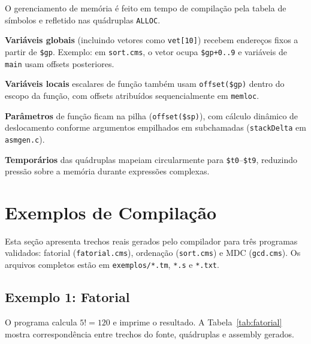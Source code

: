 \documentclass[
	12pt,				%
	openright,			%
	a4paper,			%
	english,			%
	french,				%
	spanish,			%
	brazil,				%
	]{abntex2}
\begin{document}
O gerenciamento de memória é feito em tempo de compilação pela tabela de símbolos e refletido nas quádruplas \texttt{ALLOC}.

\textbf{Variáveis globais} (incluindo vetores como \texttt{vet[10]}) recebem endereços fixos a partir de \texttt{\$gp}. Exemplo: em \texttt{sort.cms}, o vetor ocupa \texttt{\$gp+0..9} e variáveis de \texttt{main} usam offsets posteriores.

\textbf{Variáveis locais} escalares de função também usam \texttt{offset(\$gp)} dentro do escopo da função, com offsets atribuídos sequencialmente em \texttt{memloc}.

\textbf{Parâmetros} de função ficam na pilha (\texttt{offset(\$sp)}), com cálculo dinâmico de deslocamento conforme argumentos empilhados em subchamadas (\texttt{stackDelta} em \texttt{asmgen.c}).

\textbf{Temporários} das quádruplas mapeiam circularmente para \texttt{\$t0}--\texttt{\$t9}, reduzindo pressão sobre a memória durante expressões complexas.

\chapter{Exemplos de Compilação}

Esta seção apresenta trechos reais gerados pelo compilador para três programas validados: fatorial (\texttt{fatorial.cms}), ordenação (\texttt{sort.cms}) e MDC (\texttt{gcd.cms}). Os arquivos completos estão em \texttt{exemplos/*.tm}, \texttt{*.s} e \texttt{*.txt}.

\section{Exemplo 1: Fatorial}

O programa calcula $5! = 120$ e imprime o resultado. A Tabela~\ref{tab:fatorial} mostra correspondência entre trechos do fonte, quádruplas e assembly gerados.
\end{document}

